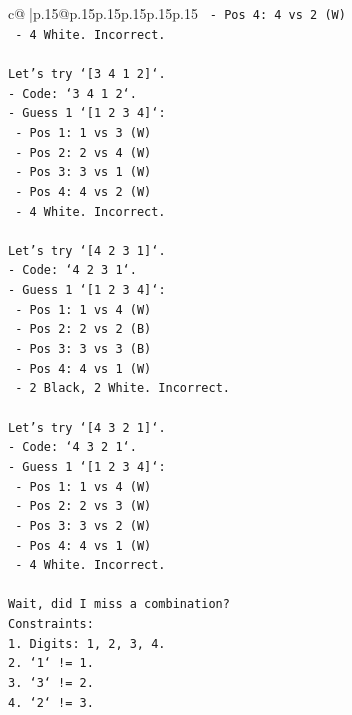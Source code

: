 \documentclass{article}
\begin{document}
{\begin{supertabular}{c@{$\;$}|p{.15\linewidth}@{}p{.15\linewidth}p{.15\linewidth}p{.15\linewidth}p{.15\linewidth}p{.15\linewidth}}
{{{\texttt{    {-} Pos 4: 4 vs 2 (W)} \\
\texttt{    {-} 4 White. Incorrect.} \\
\\ 
\texttt{Let's try `{[}3 4 1 2{]}`.} \\
\texttt{{-} Code: `3 4 1 2`.} \\
\texttt{{-} Guess 1 `{[}1 2 3 4{]}`:} \\
\texttt{    {-} Pos 1: 1 vs 3 (W)} \\
\texttt{    {-} Pos 2: 2 vs 4 (W)} \\
\texttt{    {-} Pos 3: 3 vs 1 (W)} \\
\texttt{    {-} Pos 4: 4 vs 2 (W)} \\
\texttt{    {-} 4 White. Incorrect.} \\
\\ 
\texttt{Let's try `{[}4 2 3 1{]}`.} \\
\texttt{{-} Code: `4 2 3 1`.} \\
\texttt{{-} Guess 1 `{[}1 2 3 4{]}`:} \\
\texttt{    {-} Pos 1: 1 vs 4 (W)} \\
\texttt{    {-} Pos 2: 2 vs 2 (B)} \\
\texttt{    {-} Pos 3: 3 vs 3 (B)} \\
\texttt{    {-} Pos 4: 4 vs 1 (W)} \\
\texttt{    {-} 2 Black, 2 White. Incorrect.} \\
\\ 
\texttt{Let's try `{[}4 3 2 1{]}`.} \\
\texttt{{-} Code: `4 3 2 1`.} \\
\texttt{{-} Guess 1 `{[}1 2 3 4{]}`:} \\
\texttt{    {-} Pos 1: 1 vs 4 (W)} \\
\texttt{    {-} Pos 2: 2 vs 3 (W)} \\
\texttt{    {-} Pos 3: 3 vs 2 (W)} \\
\texttt{    {-} Pos 4: 4 vs 1 (W)} \\
\texttt{    {-} 4 White. Incorrect.} \\
\\ 
\texttt{Wait, did I miss a combination?} \\
\texttt{Constraints:} \\
\texttt{1. Digits: 1, 2, 3, 4.} \\
\texttt{2. `1` != 1.} \\
\texttt{3. `3` != 2.} \\
\texttt{4. `2` != 3.} \\
}}}
\end{supertabular}}
\end{document}
